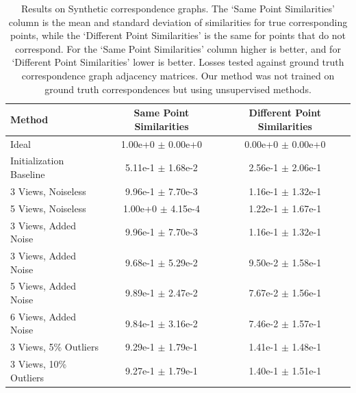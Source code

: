 \documentclass[10pt,twocolumn,letterpaper]{article}
\begin{document}
\begin{table}
\begin{center}
\begin{tabular}{|l|c|c|}
\hline
Method & Same Point Similarities & Different Point Similarities  \\
\hline\hline\hline
Ideal                              & 1.00e+0 $\pm$ 0.00e+0 & 0.00e+0 $\pm$ 0.00e+0 \\ \hline
Initialization Baseline            & 5.11e-1 $\pm$ 1.68e-2 & 2.56e-1 $\pm$ 2.06e-1 \\ \hline
3 Views, Noiseless                 & 9.96e-1 $\pm$ 7.70e-3 & 1.16e-1 $\pm$ 1.32e-1 \\ \hline
5 Views, Noiseless                 & 1.00e+0 $\pm$ 4.15e-4 & 1.22e-1 $\pm$ 1.67e-1 \\ \hline
3 Views, Added Noise               & 9.96e-1 $\pm$ 7.70e-3 & 1.16e-1 $\pm$ 1.32e-1 \\ \hline
3 Views, Added Noise               & 9.68e-1 $\pm$ 5.29e-2 & 9.50e-2 $\pm$ 1.58e-1 \\ \hline
5 Views, Added Noise               & 9.89e-1 $\pm$ 2.47e-2 & 7.67e-2 $\pm$ 1.56e-1 \\ \hline
6 Views, Added Noise               & 9.84e-1 $\pm$ 3.16e-2 & 7.46e-2 $\pm$ 1.57e-1 \\ \hline
3 Views, 5\% Outliers              & 9.29e-1 $\pm$ 1.79e-1 & 1.41e-1 $\pm$ 1.48e-1 \\ \hline
3 Views, 10\% Outliers             & 9.27e-1 $\pm$ 1.79e-1 & 1.40e-1 $\pm$ 1.51e-1 \\ \hline

\hline
\end{tabular}
\end{center}
\caption{
Results on Synthetic correspondence graphs.
The `Same Point Similarities' column is the mean and standard deviation of similarities for true corresponding points, while the `Different Point Similarities' is the same for points that do not correspond.
For the `Same Point Similarities' column higher is better, and for `Different Point Similarities' lower is better.
Losses tested against ground truth correspondence graph adjacency matrices.
Our method was not trained on ground truth correspondences but using unsupervised methods.
}
\label{fig:synthtable}
\end{table}
\end{document}
